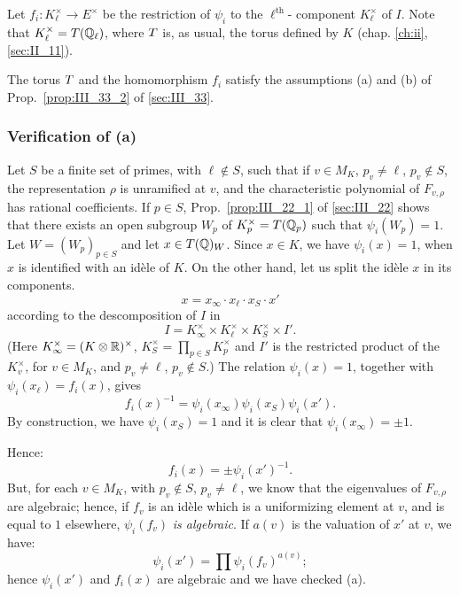 Let $f_i \colon  K_\ell^\times \to E^\times$ be the restriction of $\psi_i$ to
the $\ell^{\text{th}}$- component $K^{\times}_\ell$ of $I$. Note that
$K^\times_\ell = T(\mathbb{Q}_\ell)$, where $T$ is, as usual, the torus defined by
$K$ (chap. \ref{ch:ii}, \ref{sec:II_11}).

\begin{lem}
The torus $T$ and the homomorphism $f_i$ satisfy the assumptions (a) and (b)
of Prop.~\ref{prop:III_33_2} of \ref{sec:III_33}. 
\end{lem}

\subsubsection*{Verification of (a)}

Let $S$ be a finite set of primes, with $\ell \not\in S$, such that if $v \in
M_K$, $p_v \neq \ell$, $p_v \not\in S$, the representation $\rho$ is unramified
at $v$, and the characteristic polynomial of $F_{v,\rho}$ has rational
coefficients. If $p \in S$, Prop.~\ref{prop:III_22_1} of \ref{sec:III_22} shows
that there exists an open subgroup
$W_p$ of $K_p^\times = T(\mathbb{Q}_p)$ such that $\psi_i(W_p) = 1$. Let $W =
(W_p)_{p \in S}$ and let $x \in T(\mathbb{Q})_W$. Since $x \in K$, we have $\psi_i(x)
= 1$, when $x$ is identified with an idèle of $K$. On the other hand, let us
split the idèle $x$ in its components.
\[
	x = x_\infty \cdot x_\ell \cdot x_S \cdot x'
\]
\dpage
according to the descomposition of $I$ in
\[
	I = K_\infty^\times \times K_\ell^\times \times K_S^\times \times I'.
\]
(Here $K_\infty^\times = (K \otimes \mathbb{R})^\times$,\label{errata:Kinfty}
$K_S^\times = \prod_{p \in S} K^\times_p$ and $I'$ is the restricted product of
the $K_v^\times$, for $v \in M_K$, and $p_v \neq \ell$, $p_v \not\in S$.)
The relation $\psi_i(x)=1$, together with $\psi_i(x_\ell) = f_i(x)$, gives
\[
	f_i(x)^{-1} = \psi_i(x_\infty) \psi_i(x_S) \psi_i(x').
\]
By construction, we have $\psi_i(x_S) = 1$ and it is clear that
$\psi_i(x_\infty) = \pm 1$.

Hence:
\[
	f_i(x) = \pm \psi_i(x')^{-1}.
\]
But, for each $v \in M_K$, with $p_v \not\in S$, $p_v \neq \ell$, we know that
the eigenvalues of $F_{v,\rho}$ are algebraic; hence, if $f_v$ is an idèle which
is a uniformizing element at $v$, and is equal to $1$ elsewhere, $\psi_i(f_v)$
\emph{is algebraic}. If $a(v)$ is the valuation of $x'$ at $v$, we have:
\[
	\psi_i(x') = \prod \psi_i(f_v)^{a(v)};
\]
hence $\psi_i(x')$ and $f_i(x)$ are algebraic and we have checked (a).

